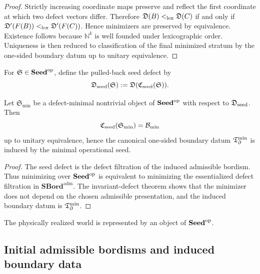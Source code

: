 \begin{proof}
Strictly increasing coordinate maps preserve and reflect the first coordinate at which two defect
vectors differ. Therefore $\mathfrak D(B)<_{\rm lex}\mathfrak D(C)$ if and only if
$\mathfrak D'(F(B))<_{\rm lex}\mathfrak D'(F(C))$. Hence minimizers are preserved by equivalence.
Existence follows because $\mathbb N^k$ is well founded under lexicographic order. Uniqueness is
then reduced to classification of the final minimized stratum by the one-sided boundary datum up to
unitary equivalence.
\end{proof}

\begin{definition}
\label{def:operational-seed-complexity}
For $\mathfrak S\in\mathbf{Seed}^{\mathrm{op}}$, define the pulled-back seed defect by
\begin{equation}
\mathfrak D_{\rm seed}(\mathfrak S):=\mathfrak D(\mathfrak C_{\mathrm{seed}}(\mathfrak S)).
\end{equation}
\end{definition}

\begin{corollary}
\label{cor:minimal-operational-seed}
Let $\mathfrak S_{\min}$ be a defect-minimal nontrivial object of $\mathbf{Seed}^{\mathrm{op}}$ with respect to
$\mathfrak D_{\rm seed}$. Then
\begin{equation}
\mathfrak C_{\mathrm{seed}}(\mathfrak S_{\min})=\mathcal B_{\min}
\end{equation}
up to unitary equivalence, hence the canonical one-sided boundary datum $\mathfrak T_{\partial}^{\min}$ is induced by the
minimal operational seed.
\end{corollary}

\begin{proof}
The seed defect is the defect filtration of the induced admissible bordism. Thus minimizing over
$\mathbf{Seed}^{\mathrm{op}}$ is equivalent to minimizing the essentialized defect filtration in
$\mathbf{SBord}^{\mathrm{adm}}$. The invariant-defect theorem shows that the minimizer does not
depend on the chosen admissible presentation, and the induced boundary datum is $\mathfrak T_{\partial}^{\min}$.
\end{proof}

\begin{axiom}
\label{ax:physical-operationality}
The physically realized world is represented by an object of $\mathbf{Seed}^{\mathrm{op}}$.
\end{axiom}

\subsection{Initial admissible bordisms and induced boundary data}

